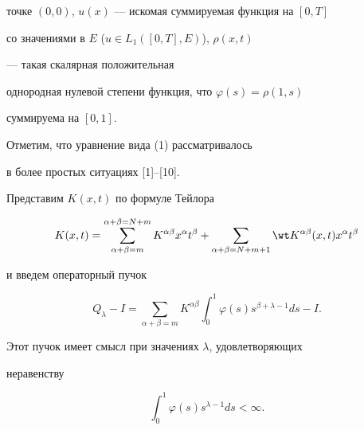 точке $(0,0)$, $u(x)$ --- искомая суммируемая функция на $[0,T]$ 


со значениями в $E$ ($u\in L_1([0,T],E)$), $\rho(x,t)$ 


--- такая скалярная положительная 


однородная нулевой степени функция, что $\varphi(s)=\rho(1,s)$ 


суммируема на $[0,1]$.


Отметим, что уравнение вида (1) рассматривалось


в более простых ситуациях [1]--[10].





Представим $K(x,t)$ по формуле Тейлора


$$


K(x,t)=\sum^{\alpha+\beta=N+m}_{\alpha+\beta=m}


K^{\alpha\beta}x^\alpha t^\beta+\sum_{\alpha+\beta=N+m+1}


\wt K{}^{\alpha\beta}(x,t)x^\alpha t^\beta


$$


и введем операторный пучок 


\begin{equation}


Q_\lambda-I=\sum_{\alpha+\beta=m}K^{\alpha\beta}\int^1_0


\varphi(s)s^{\beta+\lambda-1}ds-I.


\end{equation}


Этот пучок имеет смысл при значениях $\lambda$, удовлетворяющих 


неравенству


\begin{equation}


\int^1_0\varphi(s)s^{\lambda-1}ds<\infty.


\end{equation}





